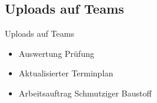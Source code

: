 \subsection{Uploads auf Teams}
\begin{frame}{Uploads auf Teams}
    \begin{itemize}
        \item[\textbullet] Auswertung Prüfung
        \item[\textbullet] Aktualisierter Terminplan
        \item[\textbullet] Arbeitsauftrag Schmutziger Baustoff
    \end{itemize}

\end{frame}



\folieFragen


